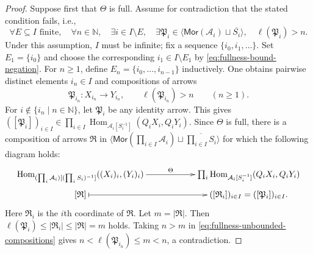 \documentclass[10pt,a4paper]{amsart}
\theoremstyle{plain}
\theoremstyle{definition}
\theoremstyle{remark}
\begin{document}
\begin{proof}
  Suppose first that $\Theta$ is full.
  Assume for contradiction that the stated condition fails, i.e.,
  \begin{equation}\label{eq:fullness-bound-negation}
    \forall E\subseteq I\text{ finite},\quad
    \forall n\in\mathbb N,\quad
    \exists i\in I\setminus E,\quad
    \exists\mathfrak P_i\in
    \langle\mathsf{Mor}(\mathcal A_i)\sqcup\overline{S_i}\rangle,
    \quad
    \ell(\mathfrak P_i)>n.
  \end{equation}
  Under this assumption, $I$ must be infinite; fix a sequence $\{i_0, i_1, \ldots\}$.
  Set $E_1 = \{i_0\}$ and choose the corresponding $i_1 \in I \setminus E_1$ by \eqref{eq:fullness-bound-negation}.
  For $n \geq 1$, define $E_n=\{i_0,\ldots,i_{n-1}\}$ inductively.
  One obtains pairwise distinct elements $i_n\in I$ and compositions of arrows
  \begin{equation}\label{eq:fullness-unbounded-compositions}
    \mathfrak P_{i_n}:X_{i_n}\longrightarrow Y_{i_n},
    \qquad
    \ell(\mathfrak P_{i_n})>n
    \qquad(n\geq 1).
  \end{equation}
  For $i\notin\{i_n\mid n\in\mathbb N\}$, let $\mathfrak P_i$ be any identity arrow.
  This gives $([\mathfrak P_i])_{i\in I}\in \prod_{i\in I} \operatorname{Hom}_{\mathcal A_i[S_i^{-1}]} (Q_iX_i,Q_iY_i)$.
  Since $\Theta$ is full, there is a composition of arrows $\mathfrak R$ in $\langle\mathsf{Mor}(\prod_{i\in I}\mathcal A_i)\sqcup\overline{\prod_{i\in I}S_i}\rangle$ for which the following diagram holds:
  \[
    \xymatrix@C=20mm@R=2mm{
    \operatorname{Hom}_{
    (\prod_i\mathcal A_i)[(\prod_iS_i)^{-1}]}
    ((X_i)_i,(Y_i)_i)
    \ar[r]^-{\Theta}
    &
    \prod_i\operatorname{Hom}_{\mathcal A_i[S_i^{-1}]}
    (Q_iX_i,Q_iY_i)
    \\
    [\mathfrak R]\ar@{|->}[r]
    &
    ([\mathfrak R_i])_{i\in I}
    =([\mathfrak P_i])_{i\in I}.
    }
  \]
  Here $\mathfrak R_i$ is the $i$th coordinate of $\mathfrak R$.
  Let $m=|\mathfrak R|$.
  Then $\ell(\mathfrak P_i) \leq |\mathfrak R_i| \leq |\mathfrak R| = m$ holds.
  Taking $n>m$ in \eqref{eq:fullness-unbounded-compositions} gives $n<\ell(\mathfrak P_{i_n})\leq m<n$, a contradiction.

  \medskip


\end{proof}
\end{document}
